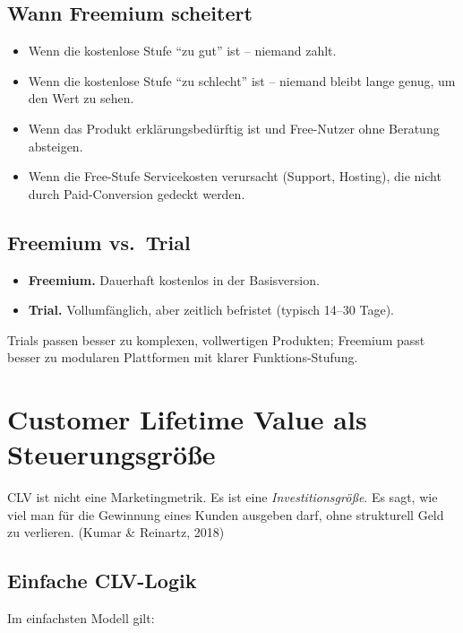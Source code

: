 \documentclass[11pt,a4paper,oneside]{article}
\newcommand{\quelle}[1]{{\footnotesize\color{lpGray}(#1)}}
\begin{document}
\subsection{Wann Freemium scheitert}

\begin{itemize}
  \item Wenn die kostenlose Stufe ``zu gut'' ist -- niemand zahlt.
  \item Wenn die kostenlose Stufe ``zu schlecht'' ist -- niemand bleibt lange genug, um den Wert zu sehen.
  \item Wenn das Produkt erklärungsbedürftig ist und Free-Nutzer ohne Beratung absteigen.
  \item Wenn die Free-Stufe Servicekosten verursacht (Support, Hosting), die nicht durch Paid-Conversion gedeckt werden.
\end{itemize}

\subsection{Freemium vs.\ Trial}

\begin{itemize}
  \item \textbf{Freemium.} Dauerhaft kostenlos in der Basisversion.
  \item \textbf{Trial.} Vollumfänglich, aber zeitlich befristet (typisch 14--30 Tage).
\end{itemize}

Trials passen besser zu komplexen, vollwertigen Produkten; Freemium passt besser zu modularen Plattformen mit klarer Funktions-Stufung.

\section{Customer Lifetime Value als Steuerungsgröße}

CLV ist nicht eine Marketingmetrik. Es ist eine \emph{Investitionsgröße}. Es sagt, wie viel man für die Gewinnung eines Kunden ausgeben darf, ohne strukturell Geld zu verlieren. \quelle{Kumar \& Reinartz, 2018}

\subsection{Einfache CLV-Logik}

Im einfachsten Modell gilt:
\end{document}

